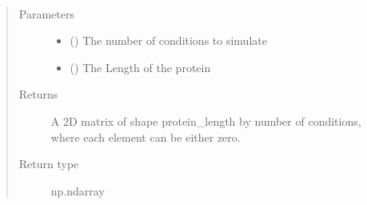 \documentclass[letterpaper,10pt,english]{sphinxmanual}
\begin{document}
\begin{fulllineitems}
\label{\detokenize{IPTK.Utils:IPTK.Utils.UtilityFunction.simulate_protein_binary_represention}}~\begin{quote}\begin{description}
\item[{Parameters}] \leavevmode\begin{itemize}
\item {} 
 () \textendash{} The number of conditions to simulate

\item {} 
 () \textendash{} The Length of the protein

\end{itemize}

\item[{Returns}] \leavevmode
A 2D matrix of shape protein\_length by number of conditions, where each element can be either zero.

\item[{Return type}] \leavevmode
np.ndarray

\end{description}\end{quote}

\end{fulllineitems}

\end{document}
